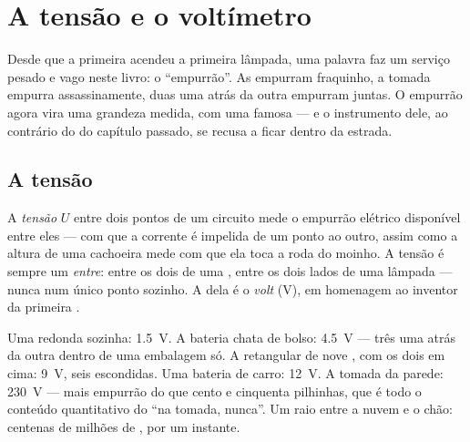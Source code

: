 \chapter{A tensão e o voltímetro}\label{ch:g8:voltage-voltmeter}

Desde que a primeira  acendeu a primeira lâmpada, uma palavra
faz um serviço pesado e vago neste livro: o ``empurrão''. As 
empurram fraquinho, a tomada empurra assassinamente, duas  uma
atrás da outra empurram juntas. O empurrão agora vira uma grandeza
medida, com uma  famosa --- e o instrumento dele, ao contrário
do do capítulo passado, se recusa a ficar dentro da estrada.

\section{A tensão}

\begin{definition}[Tensão]\label{def:g8:voltage-voltmeter:voltage}
A \emph{tensão} $U$ entre dois pontos de um circuito
mede o empurrão elétrico disponível entre eles --- com que  a
corrente é impelida de um ponto ao outro, assim como a altura de uma
cachoeira mede com que  ela toca a roda do moinho. A tensão é
sempre um \emph{entre}: entre os dois  de uma , entre os
dois lados de uma lâmpada --- nunca num único ponto sozinho. A
 dela é o \emph{volt} (\unit{V}), em homenagem ao
inventor da primeira .
\end{definition}

\begin{example}\label{ex:g8:voltage-voltmeter:values}
Uma  redonda sozinha: \qty{1.5}{V}. A bateria chata de bolso:
\qty{4.5}{V} --- três  uma atrás da outra dentro de uma
embalagem só. A retangular de nove , com os dois  em
cima: \qty{9}{V}, seis  escondidas. Uma bateria de carro:
\qty{12}{V}. A tomada da parede: \qty{230}{V} --- mais empurrão do que
cento e cinquenta pilhinhas, que é todo o conteúdo quantitativo do
``na tomada, nunca''. Um raio entre a nuvem e o chão: centenas de
milhões de , por um instante.
\end{example}

